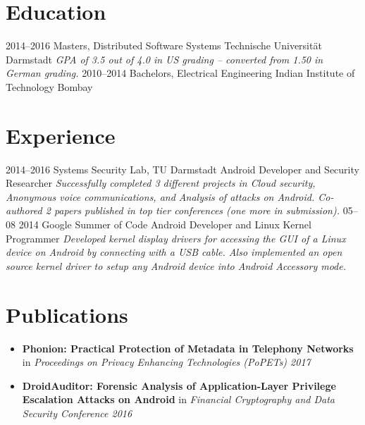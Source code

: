 \documentclass[]{friggeri-cv}
\begin{document}
\section{Education}
\begin{entrylist}
  \entry
    {2014–2016}
    {Masters, {\normalfont Distributed Software Systems}}
    {Technische Universität Darmstadt}
    {\emph{GPA of 3.5 out of 4.0 in US grading -- converted from 1.50 in German grading.}}
  \entry
    {2010–2014}
    {Bachelors, {\normalfont Electrical Engineering}}
    {Indian Institute of Technology Bombay}
    {}%
\end{entrylist}

\section{Experience}
\begin{entrylist}
  \entry
    {2014–2016}
    {Systems Security Lab, TU Darmstadt}
    {Android Developer and Security Researcher}
    {\emph{Successfully completed 3 different projects in Cloud security, Anonymous voice communications, and Analysis of attacks on Android. Co-authored 2 papers published in top tier conferences (one more in submission).}}
  \entry
    {05–08 2014}
    {Google Summer of Code}
    {Android Developer and Linux Kernel Programmer}
    {\emph{Developed kernel display drivers for accessing the GUI of a Linux device on Android by connecting with a USB cable. Also implemented an open source kernel driver to setup any Android device into Android Accessory mode.}}
\end{entrylist}

\section{Publications}
\begin{itemize}
  \item \textbf{Phonion: Practical Protection of Metadata in Telephony Networks} in \textit{Proceedings on Privacy Enhancing Technologies (PoPETs) 2017}
  \item \textbf{DroidAuditor: Forensic Analysis of Application-Layer Privilege Escalation Attacks on Android} in \textit{Financial Cryptography and Data Security Conference 2016}
\end{itemize}
~
\end{document}

